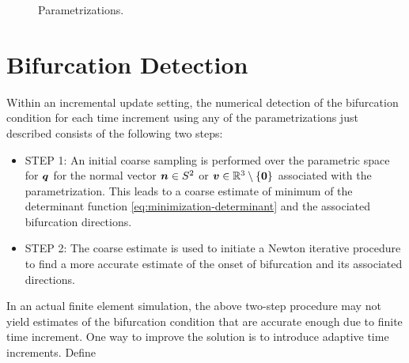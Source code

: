 \documentclass[12pt]{article}
\numberwithin{equation}{section}
\begin{document}
\begin{figure}[htbp]
\begin{center}
{      \label{fig:tangent}
    }
    \caption{Parametrizations.}
    \label{fig:parametrizations}
  \end{center}
\end{figure}

\section{Bifurcation Detection}
\label{sec:detection}

Within an incremental update setting, the numerical detection of the bifurcation condition for each time increment using any of the parametrizations just described consists of the following two steps:

\begin{itemize}
  
\item STEP 1: An initial coarse sampling is performed over the 
parametric space for ${\boldsymbol{q}}$ for the normal vector ${\boldsymbol{n}} \in S^2$ or ${\boldsymbol{v}} 
\in \mathbb{R}^3 \setminus \{\mathbf{0}\}$ associated with the 
parametrization. This leads to a coarse estimate of minimum of the 
determinant function \eqref{eq:minimization-determinant} and the 
associated bifurcation directions.
  
\item STEP 2: The coarse estimate is used to initiate a Newton
iterative procedure to find a more accurate estimate of the onset of 
bifurcation and its associated directions.

\end{itemize}

In an actual finite element simulation, the above two-step procedure 
may not yield estimates of the bifurcation condition that are accurate 
enough due to finite time increment. One way to improve the solution 
is to introduce adaptive time increments. Define
\end{document}

